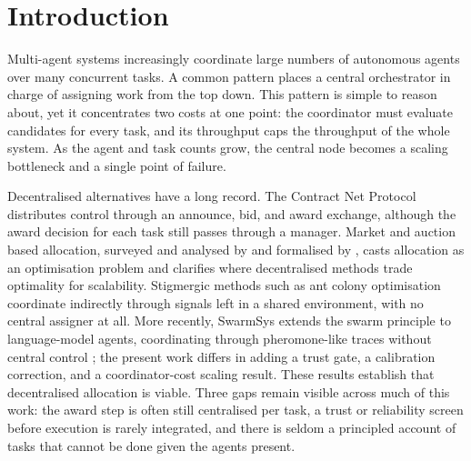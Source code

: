 \documentclass[11pt]{article}
\begin{document}
\section{Introduction}

Multi-agent systems increasingly coordinate large numbers of autonomous agents over many concurrent tasks. A common pattern places a central orchestrator in charge of assigning work from the top down. This pattern is simple to reason about, yet it concentrates two costs at one point: the coordinator must evaluate candidates for every task, and its throughput caps the throughput of the whole system. As the agent and task counts grow, the central node becomes a scaling bottleneck and a single point of failure.

Decentralised alternatives have a long record. The Contract Net Protocol \citep{smith1980contractnet} distributes control through an announce, bid, and award exchange, although the award decision for each task still passes through a manager. Market and auction based allocation, surveyed and analysed by \citet{dias2006market} and formalised by \citet{gerkey2004taxonomy}, casts allocation as an optimisation problem and clarifies where decentralised methods trade optimality for scalability. Stigmergic methods such as ant colony optimisation \citep{dorigo1996ant} coordinate indirectly through signals left in a shared environment, with no central assigner at all. More recently, SwarmSys extends the swarm principle to language-model agents, coordinating through pheromone-like traces without central control \citep{li2025swarmsys}; the present work differs in adding a trust gate, a calibration correction, and a coordinator-cost scaling result. These results establish that decentralised allocation is viable. Three gaps remain visible across much of this work: the award step is often still centralised per task, a trust or reliability screen before execution is rarely integrated, and there is seldom a principled account of tasks that cannot be done given the agents present.
\end{document}
